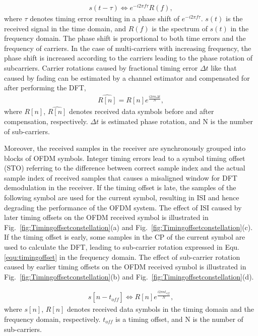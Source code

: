 \begin{eqnarray}
\label{equ:timingoffset}
               s (t - \tau )   \Leftrightarrow  e^{-i2\pi f\tau} R(f),
\end{eqnarray}
where $\tau$ denotes timing error resulting in a phase shift of $e^{-i2\pi f\tau}$.
$s(t)$ is the received signal in the time domain, and $R(f)$ is the spectrum of $s(t)$ in the frequency domain.
The phase shift is proportional to both time errors and the frequency of carriers.
In the case of multi-carriers with increasing frequency, the phase shift is increased according to the carriers leading to the phase rotation of subcarriers.
Carrier rotations caused by fractional timing error $\Delta t$ like that caused by fading can be estimated by a channel estimator and compensated for after performing the DFT,
\begin{eqnarray}
\label{equ:rotationcompensation}
               \widehat{R[n]} = R[n] e^{\frac{i2\pi n \Delta  t}{N}},
\end{eqnarray}
where $R[n]$, $\widehat{R[n]}$ denotes received data symbols before and after compensation, respectively. $\Delta t$ is estimated phase rotation, and N is the number of sub-carriers.

Moreover, the received samples in the receiver are synchronously grouped into blocks of OFDM symbols.
Integer timing errors lead to a symbol timing offset (STO) referring to the difference between correct sample index and the actual sample index of received samples that causes a misaligned window for DFT demodulation in the receiver.
If the timing offset is late, the samples of the following symbol are used for the current symbol, resulting in ISI and hence degrading the performance of the OFDM system. The effect of ISI caused by later timing offsets on the OFDM received symbol is illustrated in Fig.~\ref{fig:Timingoffsetconstellation}(a) and Fig.~\ref{fig:Timingoffsetconstellation}(c).
If the timing offset is early, some samples in the CP of the current symbol are used to calculate the DFT, leading to sub-carrier rotation expressed in Equ.\ref{equ:timingoffset} in the frequency domain.
The effect of sub-carrier rotation caused by earlier timing offsets on the OFDM received symbol is illustrated in Fig.~\ref{fig:Timingoffsetconstellation}(b) and Fig.~\ref{fig:Timingoffsetconstellation}(d).

\begin{eqnarray}
\label{equ:rotationcompensation}
              s[n - \mathit{t_{off}}]  \Leftrightarrow R[n] e^{\frac{i2\pi n \mathit{t_{off}}}{N}},
\end{eqnarray}
where $s[n]$, $R[n]$ denotes received data symbols in the timing domain and the frequency domain, respectively. $\mathit{t_{off}}$ is a timing offset, and N is the number of sub-carriers.

